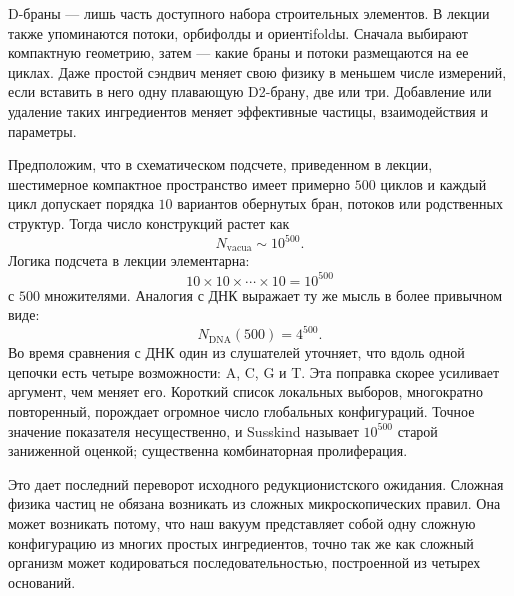 D-браны — лишь часть доступного набора строительных элементов. В лекции также упоминаются потоки, орбифолды и ориентifoldы. Сначала выбирают компактную геометрию, затем — какие браны и потоки размещаются на ее циклах. Даже простой сэндвич меняет свою физику в меньшем числе измерений, если вставить в него одну плавающую D2-брану, две или три. Добавление или удаление таких ингредиентов меняет эффективные частицы, взаимодействия и параметры.

Предположим, что в схематическом подсчете, приведенном в лекции, шестимерное компактное пространство имеет примерно \(500\) циклов и каждый цикл допускает порядка \(10\) вариантов обернутых бран, потоков или родственных структур. Тогда число конструкций растет как
\begin{equation}
N_{\mathrm{vacua}} \sim 10^{500}.
\end{equation}
Логика подсчета в лекции элементарна:
\begin{equation}
10 \times 10 \times \cdots \times 10 = 10^{500}
\end{equation}
с \(500\) множителями. Аналогия с ДНК выражает ту же мысль в более привычном виде:
\begin{equation}
N_{\mathrm{DNA}}(500)=4^{500}.
\end{equation}
Во время сравнения с ДНК один из слушателей уточняет, что вдоль одной цепочки есть четыре возможности: A, C, G и T. Эта поправка скорее усиливает аргумент, чем меняет его. Короткий список локальных выборов, многократно повторенный, порождает огромное число глобальных конфигураций. Точное значение показателя несущественно, и Susskind называет \(10^{500}\) старой заниженной оценкой; существенна комбинаторная пролиферация.

Это дает последний переворот исходного редукционистского ожидания. Сложная физика частиц не обязана возникать из сложных микроскопических правил. Она может возникать потому, что наш вакуум представляет собой одну сложную конфигурацию из многих простых ингредиентов, точно так же как сложный организм может кодироваться последовательностью, построенной из четырех оснований.

\begin{classroomqa}
\end{classroomqa}


